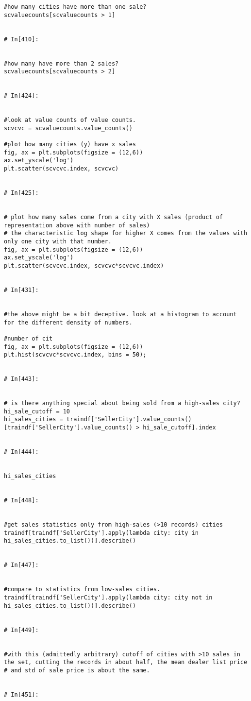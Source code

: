 \begin{verbatim}
#how many cities have more than one sale?
scvaluecounts[scvaluecounts > 1]


# In[410]:


#how many have more than 2 sales?
scvaluecounts[scvaluecounts > 2]


# In[424]:


#look at value counts of value counts.
scvcvc = scvaluecounts.value_counts()

#plot how many cities (y) have x sales
fig, ax = plt.subplots(figsize = (12,6))
ax.set_yscale('log')
plt.scatter(scvcvc.index, scvcvc)


# In[425]:


# plot how many sales come from a city with X sales (product of representation above with number of sales)
# the characteristic log shape for higher X comes from the values with only one city with that number.
fig, ax = plt.subplots(figsize = (12,6))
ax.set_yscale('log')
plt.scatter(scvcvc.index, scvcvc*scvcvc.index)


# In[431]:


#the above might be a bit deceptive. look at a histogram to account for the different density of numbers.

#number of cit
fig, ax = plt.subplots(figsize = (12,6))
plt.hist(scvcvc*scvcvc.index, bins = 50);


# In[443]:


# is there anything special about being sold from a high-sales city?
hi_sale_cutoff = 10
hi_sales_cities = traindf['SellerCity'].value_counts()[traindf['SellerCity'].value_counts() > hi_sale_cutoff].index


# In[444]:


hi_sales_cities


# In[448]:


#get sales statistics only from high-sales (>10 records) cities
traindf[traindf['SellerCity'].apply(lambda city: city in hi_sales_cities.to_list())].describe()


# In[447]:


#compare to statistics from low-sales cities.
traindf[traindf['SellerCity'].apply(lambda city: city not in hi_sales_cities.to_list())].describe()


# In[449]:


#with this (admittedly arbitrary) cutoff of cities with >10 sales in the set, cutting the records in about half, the mean dealer list price
# and std of sale price is about the same. 


# In[451]:



\end{verbatim}
